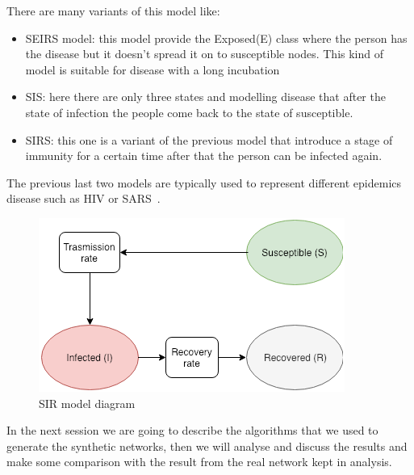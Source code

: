     There are many variants of this model like:
    \begin{itemize}
      \item SEIRS model: this model provide the Exposed(E) class where the person has the disease but it doesn't spread it on to susceptible nodes.
      This kind of model is suitable for disease with a long incubation 
      \item SIS: here there are only three states and modelling disease that after the state of infection the people come back to the state of susceptible.
      \item SIRS: this one is a variant of the previous model that introduce a stage of immunity for a certain time after that the person can be infected again.
    \end{itemize}
    The previous last two models are typically used to represent different epidemics disease such as HIV or SARS~\cite{hethcote2000mathematics}.
    
    \begin{figure}[t]
        \centering
        \includegraphics[width=\linewidth]{Figure/sir.png}
        \caption{SIR model diagram}
        \label{fig:SIRDiagram}
    \end{figure}
    
    In the next session we are going to describe the algorithms that we used to generate the synthetic networks, then we will analyse and discuss the results and make some comparison with the result from the real network kept in analysis.